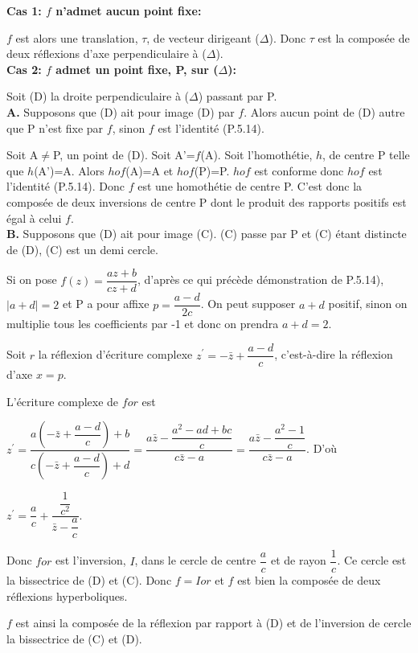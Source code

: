 \documentclass[a4paper, 12pt, twoside]{book}
\begin{document}
 
\textbf{ Cas 1: $f$ n'admet aucun point fixe:}\

$f$ est alors une translation, $\tau$, de vecteur dirigeant ($\Delta$). Donc $\tau$ est la composée de deux réflexions d'axe perpendiculaire à ($\Delta$).\\

\textbf{ Cas 2: $f$ admet un point fixe, P, sur ($\Delta$):}\

Soit (D) la droite perpendiculaire à ($\Delta$) passant par P.\\

\textbf{A.} Supposons que (D) ait pour image (D) par $f$. Alors aucun point de (D) autre que P n'est fixe par $f$, sinon $f$ est l'identité (P.5.14).\

Soit A$\neq$P, un point de (D). Soit A'=$f$(A). Soit l'homothétie, $h$, de centre P telle que $h$(A')=A. Alors $hof$(A)=A et $hof$(P)=P. $hof$ est conforme donc $hof$ est l'identité (P.5.14). Donc $f$ est une homothétie de centre P. C'est donc la composée de deux inversions de centre P dont le produit des rapports positifs est égal à celui $f$.\\

\textbf{B.} Supposons que (D) ait pour image (C). (C) passe par P et (C) étant distincte de (D), (C) est un demi cercle.\

Si on pose $f(z)=\dfrac{az+b}{cz+d}$, d'après ce qui précède démonstration de P.5.14), $|a+d|=2$ et P a pour affixe $p=\dfrac{a-d}{2c}$. On peut supposer  $a+d$ positif, sinon on multiplie tous les coefficients par -1 et donc on prendra $a+d=2$.\

Soit $r$ la réflexion d'écriture complexe $z^{'}=-\bar{z}+\dfrac{a-d}{c}$, c'est-à-dire la réflexion d'axe $x=p$.\

L'écriture complexe de $for$ est\

$z^{'}=\dfrac{a(-\bar{z}+\dfrac{a-d}{c})+b}{c(-\bar{z}+\dfrac{a-d}{c})+d}=\dfrac{a\bar{z}-\dfrac{a^{2}-ad+bc}{c}}{c\bar{z}-a}=\dfrac{a\bar{z}-\dfrac{a^{2}-1}{c}}{c\bar{z}-a}$. D'où\

$z^{'}=\dfrac{a}{c}+\dfrac{\dfrac{1}{c^{2}}}{\bar{z}-\dfrac{a}{c}}$.\

Donc $for$ est l'inversion, $I$, dans le cercle de centre $\dfrac{a}{c}$ et de rayon $\dfrac{1}{c}$. Ce cercle est la bissectrice de (D) et (C). Donc $f=Ior$ et $f$ est bien la composée de deux réflexions hyperboliques.\

$f$ est ainsi la composée de la réflexion par rapport à (D) et de l'inversion de cercle la bissectrice de (C) et (D).\\
\end{document}
